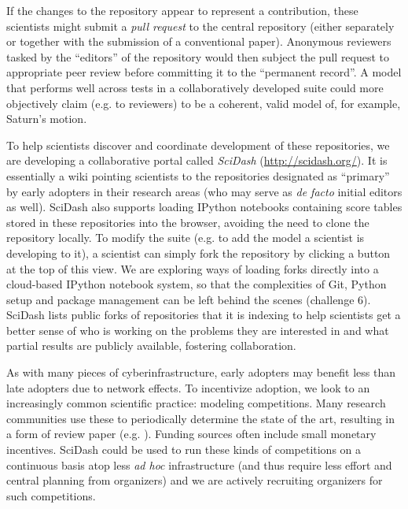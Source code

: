 \documentclass[9pt]{sig-alternate}
\begin{document}
If the changes to the repository appear to represent a contribution, these scientists might submit a \emph{pull request} to the central repository (either separately or together with the submission of a conventional paper). Anonymous reviewers tasked by the ``editors'' of the repository would then subject the pull request to appropriate peer review before committing it to the ``permanent record''. A model that performs well across tests in a collaboratively developed suite could more objectively claim (e.g. to reviewers) to be a coherent, valid model of, for example, Saturn's motion. 



To help scientists discover and coordinate development of these repositories, we are developing a collaborative portal called \textit{SciDash} (\url{http://scidash.org/}). It is essentially a wiki pointing scientists to the repositories designated as ``primary'' by early adopters in their research areas (who may serve as \emph{de facto} initial editors as well). SciDash also supports loading IPython notebooks containing score tables stored in these repositories into the browser, avoiding the need to clone the repository locally. To modify the suite (e.g. to add the model a scientist is developing to it), a scientist can simply fork the repository by clicking a button at the top of this view. We are exploring ways of loading forks directly into a cloud-based IPython notebook system, so that the complexities of Git, Python setup and package management can be left behind the scenes (challenge 6). SciDash lists public forks of repositories that it is indexing to help scientists get a better sense of who is working on the problems they are interested in and what partial results are publicly available, fostering collaboration.

As with many pieces of cyberinfrastructure, early adopters may benefit less than late adopters due to network effects. To incentivize adoption, we look to an increasingly common scientific practice: modeling competitions. Many research communities use these to periodically determine the state of the art, resulting in a form of review paper (e.g. \cite{jolivet_quantitative_2008}). Funding sources often include small monetary incentives.
   SciDash could be used to run these kinds of competitions on a continuous basis atop less \textit{ad hoc} infrastructure (and thus require less effort and central planning from organizers) and we are actively recruiting organizers for such competitions.
\end{document}
